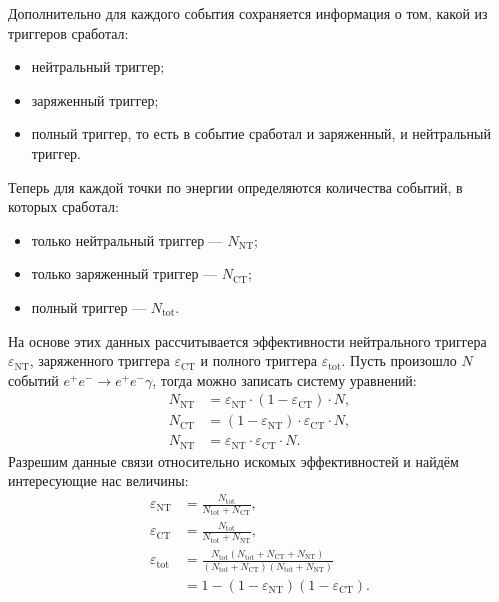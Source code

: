 Дополнительно для каждого события сохраняется информация о том,
какой из триггеров сработал:
\begin{itemize}
  \item нейтральный триггер;
  \item заряженный триггер;
  \item полный триггер, то есть в событие сработал и заряженный, и нейтральный триггер.
\end{itemize}
Теперь для каждой точки по энергии определяются количества событий, в которых сработал:
\begin{itemize}
  \item только нейтральный триггер --- $N_\text{NT}$;
  \item только заряженный триггер ---  $N_\text{CT}$;
  \item полный триггер --- $N_\text{tot}$.
\end{itemize}
На основе этих данных рассчитывается эффективности нейтрального триггера $\varepsilon_\text{NT}$,
заряженного триггера $\varepsilon_\text{CT}$ и полного триггера $\varepsilon_\text{tot}$.
Пусть произошло $N$ событий $e^+ e^- \to e^+ e^- \gamma$,
тогда можно записать систему уравнений:
\begin{align}
    N_\text{NT} &= \varepsilon_\text{NT} \cdot ( 1 - \varepsilon_\text{CT} ) \cdot N , \\
    N_\text{CT} &= ( 1 - \varepsilon_\text{NT} ) \cdot \varepsilon_\text{CT} \cdot N , \\
    N_\text{NT} &= \varepsilon_\text{NT} \cdot \varepsilon_\text{CT} \cdot N .
\end{align}
Разрешим данные связи относительно искомых эффективностей и найдём интересующие нас величины:
\begin{align}
    \varepsilon_\text{NT} &= \frac{ N_\text{tot} }{ N_\text{tot}+N_\text{CT} } , \\
    \varepsilon_\text{CT} &= \frac{ N_\text{tot} }{ N_\text{tot}+N_\text{NT} } , \\
    \varepsilon_\text{tot} &= 
    \frac{ N_\text{tot} (N_\text{tot}+N_\text{CT}+N_\text{NT}) }{
        (N_\text{tot}+N_\text{CT}) (N_\text{tot}+N_\text{NT})
    } \\
    &=
    1 - (1-\varepsilon_\text{NT}) (1-\varepsilon_\text{CT}) .
\end{align}

